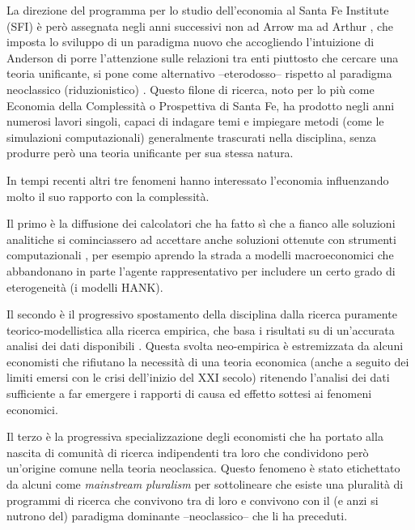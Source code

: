 \documentclass[a4paper, headings=standardclasses]{scrartcl}
\begin{document}
La direzione del programma per lo studio dell'economia al Santa Fe Institute (SFI) è però assegnata negli anni successivi non ad Arrow ma ad Arthur \parencite{fontana2010a}, che imposta lo sviluppo di un paradigma nuovo che accogliendo l'intuizione di Anderson di porre l'attenzione sulle relazioni tra enti piuttosto che cercare una teoria unificante, si pone come alternativo --eterodosso-- rispetto al paradigma neoclassico (riduzionistico) \parencite{arthur2021, fontana2010}.
Questo filone di ricerca, noto per lo più come Economia della Complessità o Prospettiva di Santa Fe, ha prodotto negli anni numerosi lavori singoli, capaci di indagare temi e impiegare metodi (come le simulazioni computazionali) generalmente trascurati nella disciplina, senza produrre però una teoria unificante per sua stessa natura.

In tempi recenti altri tre fenomeni hanno interessato l'economia influenzando molto il suo rapporto con la complessità.

Il primo è la diffusione dei calcolatori che ha fatto sì che a fianco alle soluzioni analitiche si cominciassero ad accettare anche soluzioni ottenute con strumenti computazionali \parencite{cherrier2023, backhouse2016}, per esempio aprendo la strada a modelli macroeconomici che abbandonano in parte l'agente rappresentativo per includere un certo grado di eterogeneità (i modelli HANK).

Il secondo è il progressivo spostamento della disciplina dalla ricerca puramente teorico-model\-listica alla ricerca empirica, che basa i risultati su di un'accurata analisi dei dati disponibili \parencite{cherrier2018, backhouse2017}.
Questa svolta neo-empirica è estremizzata da alcuni economisti che rifiutano la necessità di una teoria economica (anche a seguito dei limiti emersi con le crisi dell'inizio del XXI secolo) ritenendo l'analisi dei dati sufficiente a far emergere i rapporti di causa ed effetto sottesi ai fenomeni economici.

Il terzo è la progressiva specializzazione degli economisti che ha portato alla nascita di comunità di ricerca indipendenti tra loro che condividono però un'origine comune nella teoria neoclassica. Questo fenomeno è stato etichettato da alcuni come \textit{mainstream pluralism} \parencite{cedrini2018, davis2006, davis2019a} per sottolineare che esiste una pluralità di programmi di ricerca che convivono tra di loro e convivono con il (e anzi si nutrono del) paradigma dominante --neoclassico-- che li ha preceduti.
\end{document}
